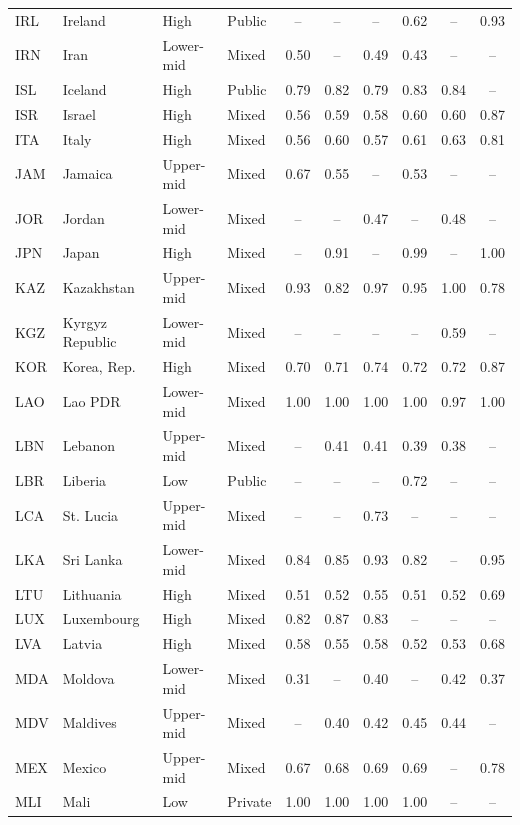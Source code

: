 \documentclass[11pt,letterpaper]{article}
\begin{document}
\begin{longtable}{@{}llllcccccc@{}}
IRL & Ireland & High & Public & -- & -- & -- & 0.62 & -- & 0.93 \\
IRN & Iran & Lower-mid & Mixed & 0.50 & -- & 0.49 & 0.43 & -- & -- \\
ISL & Iceland & High & Public & 0.79 & 0.82 & 0.79 & 0.83 & 0.84 & -- \\
ISR & Israel & High & Mixed & 0.56 & 0.59 & 0.58 & 0.60 & 0.60 & 0.87 \\
ITA & Italy & High & Mixed & 0.56 & 0.60 & 0.57 & 0.61 & 0.63 & 0.81 \\
JAM & Jamaica & Upper-mid & Mixed & 0.67 & 0.55 & -- & 0.53 & -- & -- \\
JOR & Jordan & Lower-mid & Mixed & -- & -- & 0.47 & -- & 0.48 & -- \\
JPN & Japan & High & Mixed & -- & 0.91 & -- & 0.99 & -- & 1.00 \\
KAZ & Kazakhstan & Upper-mid & Mixed & 0.93 & 0.82 & 0.97 & 0.95 & 1.00 & 0.78 \\
KGZ & Kyrgyz Republic & Lower-mid & Mixed & -- & -- & -- & -- & 0.59 & -- \\
KOR & Korea, Rep. & High & Mixed & 0.70 & 0.71 & 0.74 & 0.72 & 0.72 & 0.87 \\
LAO & Lao PDR & Lower-mid & Mixed & 1.00 & 1.00 & 1.00 & 1.00 & 0.97 & 1.00 \\
LBN & Lebanon & Upper-mid & Mixed & -- & 0.41 & 0.41 & 0.39 & 0.38 & -- \\
LBR & Liberia & Low & Public & -- & -- & -- & 0.72 & -- & -- \\
LCA & St. Lucia & Upper-mid & Mixed & -- & -- & 0.73 & -- & -- & -- \\
LKA & Sri Lanka & Lower-mid & Mixed & 0.84 & 0.85 & 0.93 & 0.82 & -- & 0.95 \\
LTU & Lithuania & High & Mixed & 0.51 & 0.52 & 0.55 & 0.51 & 0.52 & 0.69 \\
LUX & Luxembourg & High & Mixed & 0.82 & 0.87 & 0.83 & -- & -- & -- \\
LVA & Latvia & High & Mixed & 0.58 & 0.55 & 0.58 & 0.52 & 0.53 & 0.68 \\
MDA & Moldova & Lower-mid & Mixed & 0.31 & -- & 0.40 & -- & 0.42 & 0.37 \\
MDV & Maldives & Upper-mid & Mixed & -- & 0.40 & 0.42 & 0.45 & 0.44 & -- \\
MEX & Mexico & Upper-mid & Mixed & 0.67 & 0.68 & 0.69 & 0.69 & -- & 0.78 \\
MLI & Mali & Low & Private & 1.00 & 1.00 & 1.00 & 1.00 & -- & -- \\

\end{longtable}
\end{document}
